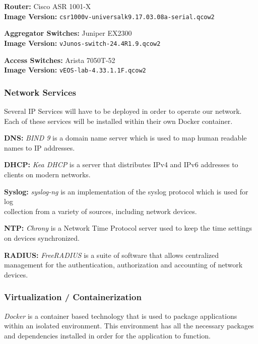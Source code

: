 \documentclass[12pt, letterpaper]{article}
\begin{document}
\smallskip

\textbf{Router:} Cisco ASR 1001-X \\
\textbf{Image Version:} 
\texttt{csr1000v-universalk9.17.03.08a-serial.qcow2}

\smallskip

\textbf{Aggregator Switches:} Juniper EX2300 \\
\textbf{Image Version:} 
\texttt{vJunos-switch-24.4R1.9.qcow2}

\smallskip

\textbf{Access Switches:} Arista 7050T-52 \\
\textbf{Image Version:} 
\texttt{vEOS-lab-4.33.1.1F.qcow2}



		\subsubsection{Network Services}
Several IP Services will have to be deployed in order to operate our network. Each of these services will be installed within their own Docker container.

\textbf{DNS:} \textit{BIND 9} is a domain name server which is used to map human readable names to IP addresses.

\smallskip

\textbf{DHCP:} \textit{Kea DHCP} is a server that distributes IPv4 and IPv6 addresses to clients on modern networks. 

\smallskip

\textbf{Syslog:} \textit{syslog-ng} is an implementation of the syslog protocol which is used for log \\ collection from a variety of sources, including network devices.

\smallskip

\textbf{NTP:} \textit{Chrony} is a Network Time Protocol server used to keep the time settings on devices synchronized.

\smallskip

\textbf{RADIUS:} \textit{FreeRADIUS} is a suite of software that allows centralized management for the authentication, authorization and accounting of network devices.


		\subsubsection{Virtualization / Containerization}
\textit{Docker} is a container based technology that is used to package applications within an isolated environment. This environment has all the necessary packages and dependencies installed in order for the application to function.
		
\end{document}
